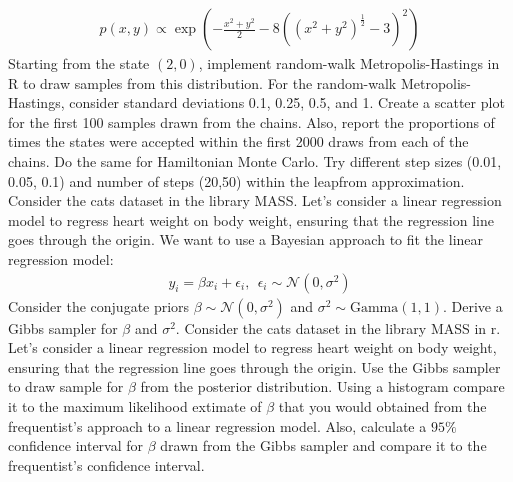 \begin{solution}
\begin{align*}
p(x,y) \propto \exp \left( - \frac{x^2 + y^2}{2} - 8 ((x^2 + y^2)^{\frac{1}{2}} - 3)^2\right)
\end{align*}
Starting from the state $(2,0)$, implement random-walk Metropolis-Hastings in R to draw samples from this distribution. For the random-walk Metropolis-Hastings, consider standard deviations 0.1, 0.25, 0.5, and 1. Create a scatter plot for the first 100 samples drawn from the chains. Also, report the proportions of times the states were accepted within the first 2000 draws from each of the chains.
\hfill\break
\hfill\break
Do the same for Hamiltonian Monte Carlo. Try different step sizes (0.01, 0.05, 0.1) and number of steps (20,50) within the leapfrom approximation.
\hfill\break
\hfill\break
Consider the cats dataset in the library MASS. Let's consider a linear regression model to regress heart weight on body weight, ensuring that the regression line goes through the origin. 
\hfill\break
\hfill\break
We want to use a Bayesian approach to fit the linear regression model:
\begin{align*}
y_{i} = \beta x_{i} + \epsilon_i, \ \ \epsilon_i \sim \mathcal{N}(0,\sigma^2)
\end{align*}
Consider the conjugate priors $\beta \sim \mathcal{N}(0,\sigma^2)$ and $\sigma^2 \sim \text{Gamma}(1,1)$. Derive a Gibbs sampler for $\beta$ and $\sigma^2$.
\hfill\break
\hfill\break
Consider the cats dataset in the library MASS in r. Let's consider a linear regression model to regress heart weight on body weight, ensuring that the regression line goes through the origin. Use the Gibbs sampler to draw sample for $\beta$ from the posterior distribution. Using a histogram compare it to the maximum likelihood extimate of $\beta$ that you would obtained from the frequentist's approach to a linear regression model. Also, calculate a $95\%$ confidence interval for $\beta$ drawn from the Gibbs sampler and compare it to the frequentist's confidence interval.
\end{solution}
